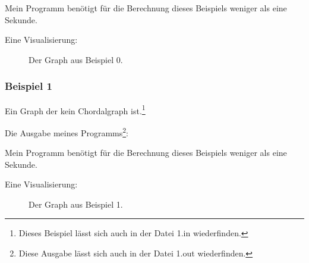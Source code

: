 Mein Programm benötigt für die Berechnung dieses Beispiels weniger als eine Sekunde.

Eine Visualisierung:

\begin{center}
\begin{figure}[h]
\caption{Der Graph aus Beispiel 0.}
\end{figure}
\end{center}


\subsubsection*{Beispiel 1}
Ein Graph der kein Chordalgraph ist.\footnote{Dieses Beispiel lässt sich auch in der Datei 1.in wiederfinden.}

{\small

}

Die Ausgabe meines Programms\footnote{Diese Ausgabe lässt sich auch in der Datei 1.out wiederfinden.}:

{\small

}

Mein Programm benötigt für die Berechnung dieses Beispiels weniger als eine Sekunde.

Eine Visualisierung:
\begin{center}
\begin{figure}[h]
\caption{Der Graph aus Beispiel 1.}
\end{figure}
\end{center}

